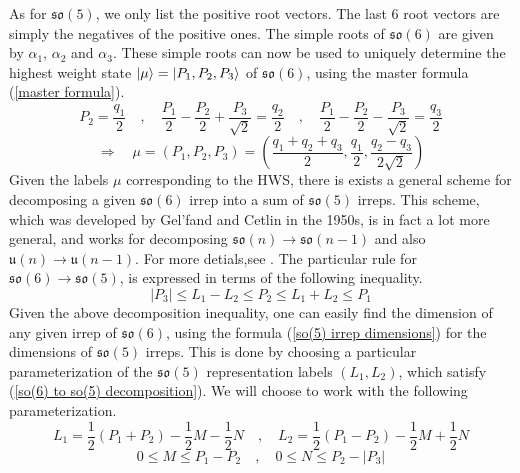 %
%
As for $\mathfrak{so}(5)$, we only list the positive root vectors. The last $6$ root vectors are simply the negatives of the positive ones. The simple roots of $\mathfrak{so}(6)$ are given by $\alpha_1$, $\alpha_2$ and $\alpha_3$. These simple roots can now be used to uniquely determine the highest weight state $\ket{\mu} = \ket{P_1,P_2,P_3}$ of $\mathfrak{so}(6)$, using the master formula (\ref{master formula}). 
%
%
\begin{equation}
P_2 = \frac{q_1}{2}
%
\quad , \quad
%
\frac{P_1}{2} - \frac{P_2}{2} + \frac{P_3}{\sqrt{2}} = \frac{q_2}{2}
%
\quad , \quad
%
\frac{P_1}{2} - \frac{P_2}{2} - \frac{P_3}{\sqrt{2}} = \frac{q_3}{2}
\end{equation}
%
%
\begin{equation}
\Rightarrow \quad
%
\mu = (P_1,P_2,P_3) = \left( \frac{q_1 + q_2 + q_3}{2}, \frac{q_1}{2}, \frac{q_2 - q_3}{2 \sqrt{2}} \right)
\end{equation}
%
%
Given the labels $\mu$ corresponding to the HWS, there is exists a general scheme for decomposing a given $\mathfrak{so}(6)$ irrep into a sum of $\mathfrak{so}(5)$ irreps. This scheme, which was developed by Gel'fand and Cetlin in the 1950s, is in fact a lot more general, and works for decomposing $\mathfrak{so}(n) \to \mathfrak{so}(n-1)$ and also $\mathfrak{u}(n) \to \mathfrak{u}(n-1)$. For more detials,see \cite{Lie groups and Lie algebras}. The particular rule for $\mathfrak{so}(6) \to \mathfrak{so}(5)$, is expressed in terms of the following inequality.
%
%
\begin{equation}\label{so(6) to so(5) decomposition}
|P_3| \leq L_1 - L_2 \leq P_2 \leq L_1 + L_2 \leq P_1
\end{equation}
%
%
Given the above decomposition inequality, one can easily find the dimension of any given irrep of $\mathfrak{so}(6)$, using the formula (\ref{so(5) irrep dimensions}) for the dimensions of $\mathfrak{so}(5)$ irreps. This is done by choosing a particular parameterization of the $\mathfrak{so}(5)$ representation labels $(L_1,L_2)$, which satisfy (\ref{so(6) to so(5) decomposition}). We will choose to work with the following parameterization.
%
%
\begin{equation}
L_1 = \frac{1}{2} (P_1 + P_2) - \frac{1}{2} M - \frac{1}{2} N
%
\quad , \quad
%
L_2 = \frac{1}{2} (P_1 - P_2) - \frac{1}{2} M + \frac{1}{2} N
\end{equation}
%
%
\begin{equation}
0 \leq M \leq P_1 - P_2
%
\quad , \quad
%
0 \leq N \leq P_2 - |P_3|
\end{equation}
%
%

